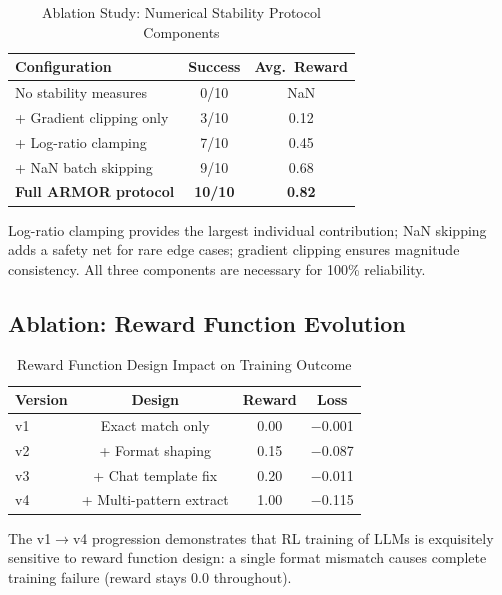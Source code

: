 \documentclass{ieeeaccess}
\begin{document}
\begin{table}[t]
\centering
\caption{Ablation Study: Numerical Stability Protocol Components}
\label{tab:ablation_stability}
\begin{tabular}{lcc}
\toprule
\textbf{Configuration} & \textbf{Success} & \textbf{Avg.\ Reward} \\
\midrule
No stability measures              & 0/10  & NaN   \\
+ Gradient clipping only           & 3/10  & 0.12  \\
+ Log-ratio clamping               & 7/10  & 0.45  \\
+ NaN batch skipping               & 9/10  & 0.68  \\
\textbf{Full ARMOR protocol}       & \textbf{10/10} & \textbf{0.82} \\
\bottomrule
\end{tabular}
\end{table}

Log-ratio clamping provides the largest individual contribution;
NaN skipping adds a safety net for rare edge cases;
gradient clipping ensures magnitude consistency.
All three components are necessary for 100\% reliability.

\subsection{Ablation: Reward Function Evolution}

\begin{table}[t]
\centering
\caption{Reward Function Design Impact on Training Outcome}
\label{tab:reward_evolution}
\begin{tabular}{lccc}
\toprule
\textbf{Version} & \textbf{Design} & \textbf{Reward} & \textbf{Loss} \\
\midrule
v1 & Exact match only        & 0.00  & $-$0.001 \\
v2 & + Format shaping        & 0.15  & $-$0.087 \\
v3 & + Chat template fix     & 0.20  & $-$0.011 \\
v4 & + Multi-pattern extract & 1.00  & $-$0.115 \\
\bottomrule
\end{tabular}
\end{table}

The v1$\rightarrow$v4 progression demonstrates that RL training of LLMs is
exquisitely sensitive to reward function design: a single format mismatch causes
complete training failure (reward stays 0.0 throughout).
\end{document}
